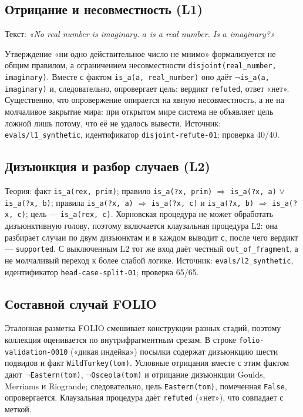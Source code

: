 \documentclass[11pt,a4paper]{article}
\begin{document}
\subsection{Отрицание и несовместность (L1)}

Текст: \emph{«No real number is imaginary. $a$ is a real number. Is $a$ imaginary?»}

Утверждение «ни одно действительное число не мнимо» формализуется не общим правилом, а ограничением несовместности
\texttt{disjoint(real\_number, imaginary)}. Вместе с фактом \texttt{is\_a(a, real\_number)} оно даёт
\texttt{$\neg$is\_a(a, imaginary)} и, следовательно, опровергает цель: вердикт \texttt{refuted}, ответ «нет».
Существенно, что опровержение опирается на явную несовместность, а не на молчаливое закрытие мира: при открытом
мире система не объявляет цель ложной лишь потому, что её не удалось вывести. Источник: \texttt{evals/l1\_synthetic},
идентификатор \texttt{disjoint-refute-01}; проверка 40/40.

\subsection{Дизъюнкция и разбор случаев (L2)}

Теория: факт \texttt{is\_a(rex, prim)}; правило \texttt{is\_a(?x, prim)} $\Rightarrow$ \texttt{is\_a(?x, a)} $\lor$ \texttt{is\_a(?x, b)};
правила \texttt{is\_a(?x, a)} $\Rightarrow$ \texttt{is\_a(?x, c)} и \texttt{is\_a(?x, b)} $\Rightarrow$ \texttt{is\_a(?x, c)};
цель — \texttt{is\_a(rex, c)}. Хорновская процедура не может обработать дизъюнктивную голову, поэтому включается клаузальная
процедура L2: она разбирает случаи по двум дизъюнктам и в каждом выводит \texttt{c}, после чего вердикт — \texttt{supported}.
С выключенным L2 тот же вход даёт честный \texttt{out\_of\_fragment}, а не молчаливый переход к более слабой логике. Источник:
\texttt{evals/l2\_synthetic}, идентификатор \texttt{head-case-split-01}; проверка 65/65.

\subsection{Составной случай FOLIO}

Эталонная разметка FOLIO смешивает конструкции разных стадий, поэтому коллекция оценивается по внутрифрагментным срезам.
В строке \texttt{folio-validation-0010} («дикая индейка») посылки содержат дизъюнкцию шести подвидов и факт
\texttt{WildTurkey(tom)}. Условные отрицания вместе с этим фактом дают \texttt{$\neg$Eastern(tom)}, \texttt{$\neg$Osceola(tom)}
и отрицание дизъюнкции Goulds, Merriams и Riogrande; следовательно, цель \texttt{Eastern(tom)}, помеченная \texttt{False},
опровергается. Клаузальная процедура даёт \texttt{refuted} («нет»), что совпадает с меткой.
\end{document}
